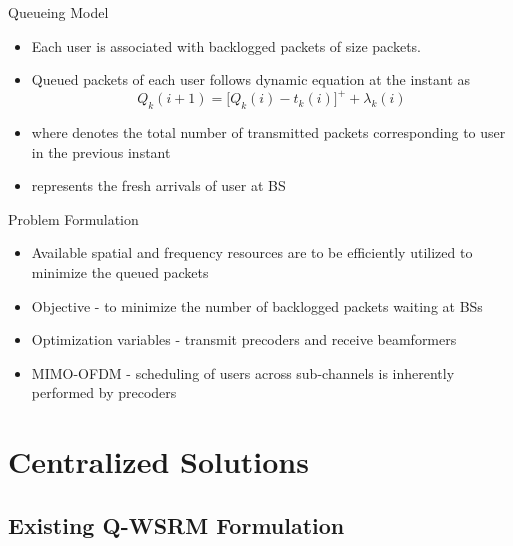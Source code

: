 \documentclass[9pt]{beamer}
\begin{document}
\begin{frame}{Queueing Model}
\begin{itemize}
\item Each user is associated with backlogged packets of size  packets.
\item Queued packets  of each user follows dynamic equation at the  instant as
\begin{equation}
Q_k(i+1) = \Big [ Q_k(i) - t_k(i) \Big ]^+ + \lambda_k(i)
\label{eqn-2a}
\end{equation}
\item where  denotes the total number of transmitted packets corresponding to user  in the previous  instant
\item {} represents the fresh arrivals of user  at \ac{BS} 
\end{itemize}
\end{frame}

\begin{frame}{Problem Formulation}
\begin{itemize}
\item Available spatial and frequency resources are to be efficiently utilized to minimize the queued packets
\item {\color{red}Objective} - to minimize the number of backlogged packets waiting at \acp{BS}
\item {\color{red}Optimization variables} - transmit precoders and receive beamformers
\item {\color{red}\ac{MIMO}-\ac{OFDM}} - scheduling of users across sub-channels is inherently performed by precoders
\end{itemize}
\end{frame}

\section{Centralized Solutions}

\subsection{Existing \acs{Q-WSRM} Formulation}
\end{document}
